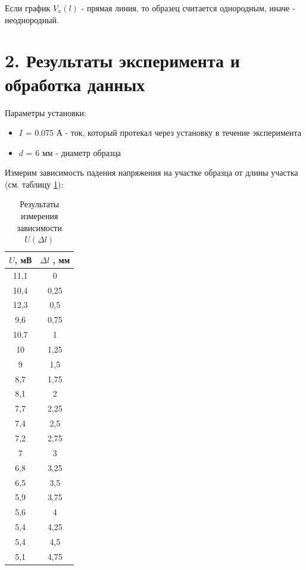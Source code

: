 \documentclass[a4paper,12pt]{report}
\begin{document}
Если график $V_x(l)$ - прямая линия, то образец считается однородным, иначе - неоднородный.

\section*{2. Результаты эксперимента и обработка данных}

Параметры установки:
\begin{itemize}
    \item $I$ = 0.075 А - ток, который протекал через установку в течение эксперимента
    \item $d$ = 6 мм - диаметр образца
\end{itemize}

Измерим зависимость падения напряжения на участке образца от длины участка (см. таблицу \ref{tab1}):

\begin{table}[ht]
\begin{tabular}{|c|c|}
\hline
$U$, мВ & $\Delta l$ , мм \\ \hline
11,1  & 0            \\ \hline
10,4  & 0,25         \\ \hline
12,3  & 0,5          \\ \hline
9,6   & 0,75         \\ \hline
10,7  & 1            \\ \hline
10    & 1,25         \\ \hline
9     & 1,5          \\ \hline
8,7   & 1,75         \\ \hline
8,1   & 2            \\ \hline
7,7   & 2,25         \\ \hline
7,4   & 2,5          \\ \hline
7,2   & 2,75         \\ \hline
7     & 3            \\ \hline
6,8   & 3,25         \\ \hline
6,5   & 3,5          \\ \hline
5,9   & 3,75         \\ \hline
5,6   & 4            \\ \hline
5,4   & 4,25         \\ \hline
5,4   & 4,5          \\ \hline
5,1   & 4,75         \\ \hline
\end{tabular}
\caption{Результаты измерения зависимости $U(\Delta l)$}
\label{tab1}
\end{table}
\end{document}
